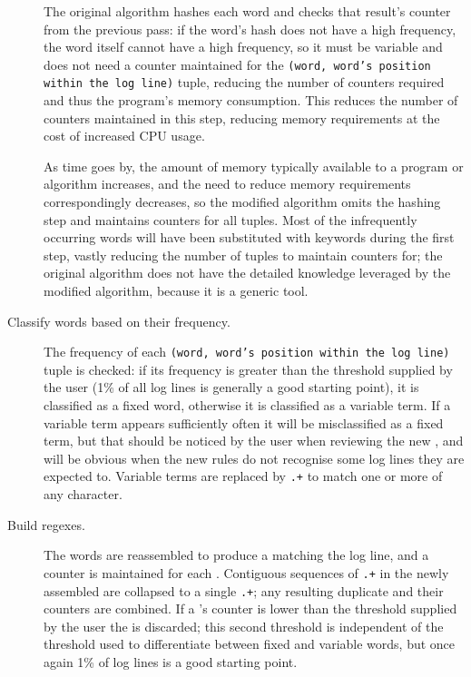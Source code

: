 \begin{description}
        The original algorithm hashes each word and checks that result's
        counter from the previous pass: if the word's hash does not have a
        high frequency, the word itself cannot have a high frequency, so it
        must be variable and does not need a counter maintained for the
        \texttt{(word, word's position within the log line)} tuple,
        reducing the number of counters required and thus the program's
        memory consumption.  This reduces the number of counters maintained
        in this step, reducing memory requirements at the cost of increased
        CPU usage.

        As time goes by, the amount of memory typically available to a
        program or algorithm increases, and the need to reduce memory
        requirements correspondingly decreases, so the modified algorithm
        omits the hashing step and maintains counters for all tuples.  Most
        of the infrequently occurring words will have been substituted with
        keywords during the first step, vastly reducing the number of
        tuples to maintain counters for; the original algorithm does not
        have the detailed knowledge leveraged by the modified algorithm,
        because it is a generic tool.

    \item [Classify words based on their frequency.]  The frequency of each
        \texttt{(word, word's position within the log line)} tuple is
        checked: if its frequency is greater than the threshold supplied by
        the user (1\% of all log lines is generally a good starting point),
        it is classified as a fixed word, otherwise it is classified as a
        variable term.  If a variable term appears sufficiently often it
        will be misclassified as a fixed term, but that should be noticed
        by the user when reviewing the new \regexes{}, and will be obvious
        when the new rules do not recognise some log lines they are
        expected to.  Variable terms are replaced by \texttt{.+} to match
        one or more of any character.

    \item [Build regexes.]  The words are reassembled to produce a
         matching the log line, and a counter is maintained
        for each .  Contiguous sequences of \texttt{.+} in
        the newly assembled \regexes{} are collapsed to a single
        \texttt{.+}; any resulting duplicate \regexes{} and their counters
        are combined.  If a 's counter is lower than the
        threshold supplied by the user the  is discarded;
        this second threshold is independent of the threshold used to
        differentiate between fixed and variable words, but once again 1\%
        of log lines is a good starting point.


\end{description}
